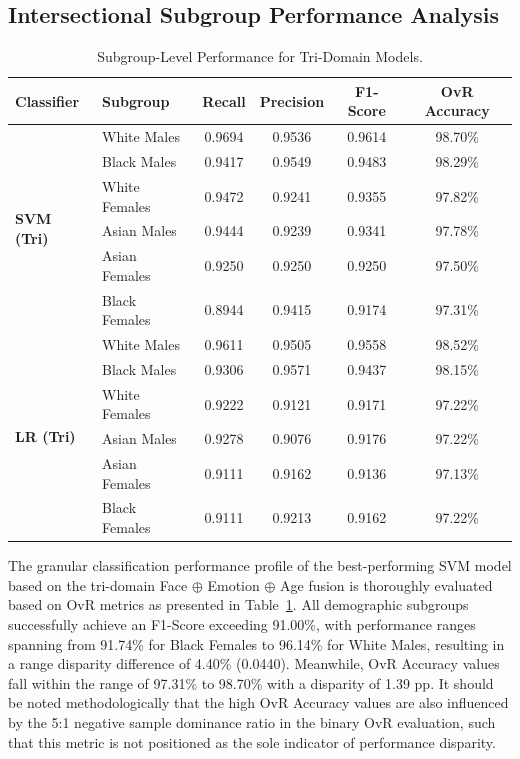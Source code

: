 \subsection{Intersectional Subgroup Performance Analysis}
\label{sec:subgroup_performance}

\begin{table}[htbp]
\caption{Subgroup-Level Performance for Tri-Domain Models.}
\label{tab:XI}
\centering
\begin{tabular}{llcccc}
\toprule
Classifier & Subgroup & Recall & Precision & F1-Score & OvR Accuracy \\
\midrule
\multirow{6}{*}{\textbf{SVM (Tri)}} & White Males & 0.9694 & 0.9536 & 0.9614 & 98.70\% \\
 & Black Males & 0.9417 & 0.9549 & 0.9483 & 98.29\% \\
 & White Females & 0.9472 & 0.9241 & 0.9355 & 97.82\% \\
 & Asian Males & 0.9444 & 0.9239 & 0.9341 & 97.78\% \\
 & Asian Females & 0.9250 & 0.9250 & 0.9250 & 97.50\% \\
 & Black Females & 0.8944 & 0.9415 & 0.9174 & 97.31\% \\
\midrule
\multirow{6}{*}{\textbf{LR (Tri)}} & White Males & 0.9611 & 0.9505 & 0.9558 & 98.52\% \\
 & Black Males & 0.9306 & 0.9571 & 0.9437 & 98.15\% \\
 & White Females & 0.9222 & 0.9121 & 0.9171 & 97.22\% \\
 & Asian Males & 0.9278 & 0.9076 & 0.9176 & 97.22\% \\
 & Asian Females & 0.9111 & 0.9162 & 0.9136 & 97.13\% \\
 & Black Females & 0.9111 & 0.9213 & 0.9162 & 97.22\% \\
\bottomrule
\end{tabular}
\end{table}

The granular classification performance profile of the best-performing SVM model based on the tri-domain Face $\oplus$ Emotion $\oplus$ Age fusion is thoroughly evaluated based on OvR metrics as presented in Table~\ref{tab:XI}. All demographic subgroups successfully achieve an F1-Score exceeding 91.00\%, with performance ranges spanning from 91.74\% for Black Females to 96.14\% for White Males, resulting in a range disparity difference of 4.40\% (0.0440). Meanwhile, OvR Accuracy values fall within the range of 97.31\% to 98.70\% with a disparity of 1.39 pp. It should be noted methodologically that the high OvR Accuracy values are also influenced by the 5:1 negative sample dominance ratio in the binary OvR evaluation, such that this metric is not positioned as the sole indicator of performance disparity.


